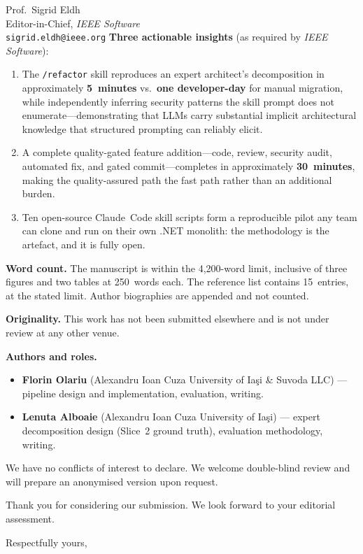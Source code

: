 \documentclass[11pt, a4paper]{letter}
\begin{document}
\begin{letter}{%
  Prof.\ Sigrid Eldh\\
  Editor-in-Chief, \textit{IEEE Software}\\
  \texttt{sigrid.eldh@ieee.org}
}
\textbf{Three actionable insights} (as required by \textit{IEEE
Software}):
\begin{enumerate}
  \item The \texttt{/refactor} skill reproduces an expert architect's
        decomposition in approximately \textbf{5~minutes} vs.\
        \textbf{one developer-day} for manual migration, while
        independently inferring security patterns the skill prompt
        does not enumerate---demonstrating that LLMs carry substantial
        implicit architectural knowledge that structured prompting can
        reliably elicit.
  \item A complete quality-gated feature addition---code, review,
        security audit, automated fix, and gated commit---completes in
        approximately \textbf{30~minutes}, making the quality-assured
        path the fast path rather than an additional burden.
  \item Ten open-source Claude~Code skill scripts form a reproducible
        pilot any team can clone and run on their own .NET monolith:
        the methodology is the artefact, and it is fully open.
\end{enumerate}

\textbf{Word count.}  The manuscript is within the 4{,}200-word limit,
inclusive of three figures and two tables at 250~words each.  The
reference list contains 15~entries, at the stated limit.  Author
biographies are appended and not counted.

\textbf{Originality.}  This work has not been submitted elsewhere and
is not under review at any other venue.

\textbf{Authors and roles.}
\begin{itemize}
  \item \textbf{Florin Olariu} (Alexandru Ioan Cuza University of
    Ia\c{s}i \& Suvoda LLC) --- pipeline design and implementation,
    evaluation, writing.
  \item \textbf{Lenuta Alboaie} (Alexandru Ioan Cuza University of
    Ia\c{s}i) --- expert decomposition design (Slice~2 ground truth),
    evaluation methodology, writing.
\end{itemize}

We have no conflicts of interest to declare.  We welcome double-blind
review and will prepare an anonymised version upon request.

Thank you for considering our submission.  We look forward to your
editorial assessment.

\closing{Respectfully yours,}

\end{letter}
\end{document}
